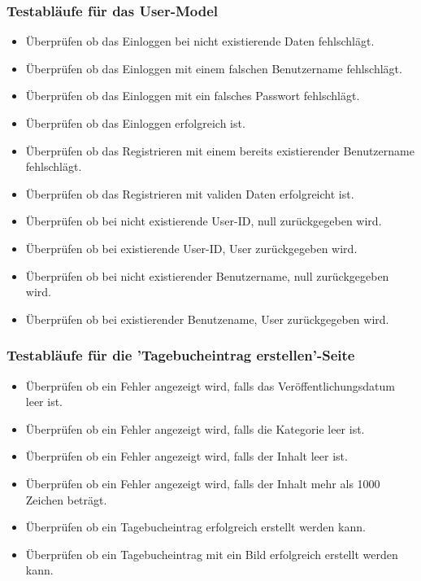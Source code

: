 \subsubsection*{Testabläufe für das User-Model}
\begin{itemize}
  \item Überprüfen ob das Einloggen bei nicht existierende Daten fehlschlägt.
  \item Überprüfen ob das Einloggen mit einem falschen Benutzername fehlschlägt.
  \item Überprüfen ob das Einloggen mit ein falsches Passwort fehlschlägt.
  \item Überprüfen ob das Einloggen erfolgreich ist.
  \item Überprüfen ob das Registrieren mit einem bereits existierender Benutzername fehlschlägt.
  \item Überprüfen ob das Registrieren mit validen Daten erfolgreicht ist.
  \item Überprüfen ob bei nicht existierende User-ID, null zurückgegeben wird.
  \item Überprüfen ob bei existierende User-ID, User zurückgegeben wird.
  \item Überprüfen ob bei nicht existierender Benutzername, null zurückgegeben wird.
  \item Überprüfen ob bei existierender Benutzename, User zurückgegeben wird.
\end{itemize}

\subsubsection*{Testabläufe für die 'Tagebucheintrag erstellen'-Seite}
\begin{itemize}
  \item Überprüfen ob ein Fehler angezeigt wird, falls das Veröffentlichungsdatum leer ist.
  \item Überprüfen ob ein Fehler angezeigt wird, falls die Kategorie leer ist.
  \item Überprüfen ob ein Fehler angezeigt wird, falls der Inhalt leer ist.
  \item Überprüfen ob ein Fehler angezeigt wird, falls der Inhalt mehr als 1000 Zeichen beträgt.
  \item Überprüfen ob ein Tagebucheintrag erfolgreich erstellt werden kann.
  \item Überprüfen ob ein Tagebucheintrag mit ein Bild erfolgreich erstellt werden kann.
\end{itemize}

